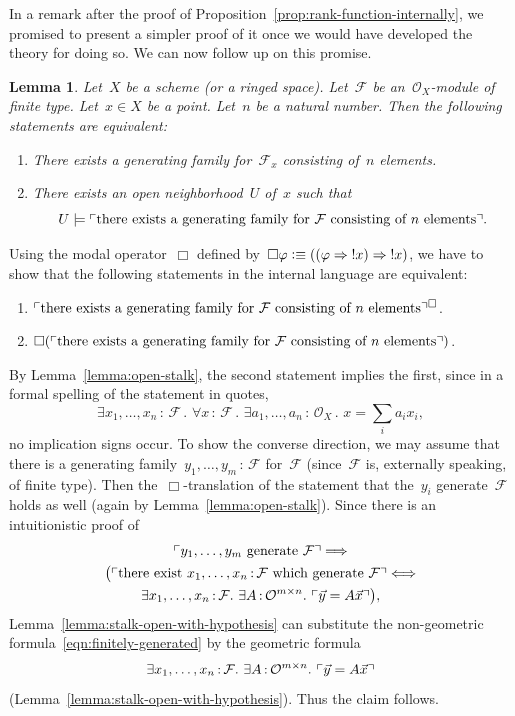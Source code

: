 \documentclass[10pt,reqno,a4paper]{amsbook}
\makeatletter
\theoremstyle{definition}
\theoremstyle{plain}
\newtheorem{lemma}[defn]{Lemma}
\theoremstyle{remark}
\newcommand{\F}{\mathcal{F}}
\renewcommand{\O}{\mathcal{O}}
\newcommand{\?}{\,{:}\,}
\renewcommand{\_}{\mathpunct{.}\,}
\newcommand{\speak}[1]{\ulcorner\text{\textnormal{#1}}\urcorner}
\newcommand{\notat}[1]{{!#1}}
\newcommand{\defequiv}{\vcentcolon\equiv}
\renewenvironment{proof}[1][\proofname]{\par
  \pushQED{\qed}%
  \normalfont \topsep6\p@\@plus6\p@\relax
  \trivlist
  \item[\hskip\labelsep
        \itshape
    #1\@addpunct{.}]\ignorespaces
}{%
  \popQED\endtrivlist\@endpefalse
}
\makeatother
\begin{document}
In a remark after the proof of Proposition~\ref{prop:rank-function-internally},
we promised to present a simpler proof of it once we would have developed the theory for
doing so. We can now follow up on this promise.
\begin{lemma}\label{lemma:gen-family-n}
Let~$X$ be a scheme (or a ringed space). Let~$\F$ be an~$\O_X$-module
of finite type. Let~$x \in X$ be a point. Let~$n$ be a natural number. Then the
following statements are equivalent:
\begin{enumerate}
\item There exists a generating family for~$\F_x$ consisting of~$n$ elements.
\item There exists an open neighborhood~$U$ of~$x$ such that
\[ U \models \speak{there exists a generating family for~$\F$ consisting of~$n$
elements}. \]
\end{enumerate}
\end{lemma}
\begin{proof}Using the modal operator~$\Box$ defined by~$\Box\varphi \defequiv
((\varphi \Rightarrow \notat{x}) \Rightarrow \notat{x})$, we have to show that
the following statements in the internal language are equivalent:
\begin{enumerate}
\item $\speak{there exists a generating family
for~$\F$ consisting of~$n$ elements}^\Box$.
\item $\Box(\speak{there exists a generating family
for~$\F$ consisting of~$n$ elements})$.
\end{enumerate}
By Lemma~\ref{lemma:open-stalk}, the second statement implies the first, since
in a formal spelling of the statement in quotes,
\begin{equation}\label{eqn:finitely-generated}\tag{$\star$}
  \exists x_1,\ldots,x_n\?\F\_
  \forall x\?\F\_
  \exists a_1,\ldots,a_n\?\O_X\_
  x = \textstyle\sum_i a_i x_i,
\end{equation}
no implication signs occur. To show the converse direction,
we may assume that there is a generating family~$y_1,\ldots,y_m\?\F$ for~$\F$
(since~$\F$ is, externally speaking, of finite type). Then
the~$\Box$-translation of the statement that the~$y_i$ generate~$\F$ holds as
well (again by Lemma~\ref{lemma:open-stalk}). Since there is an intuitionistic
proof of
\begin{multline*}
  \speak{$y_1,\ldots,y_m$ generate~$\F$} \Longrightarrow \\
  \bigl(\speak{there exist $x_1,\ldots,x_n\?\F$ which generate~$\F$}
    \Longleftrightarrow \\
    \exists x_1,\ldots,x_n\?\F\_
    \exists A\?\O^{m \times n}\_ \speak{$\vec y = A \vec x$}\bigr),
\end{multline*}
Lemma~\ref{lemma:stalk-open-with-hypothesis} can substitute the non-geometric formula~\eqref{eqn:finitely-generated} by the geometric
formula
\[ \exists x_1,\ldots,x_n\?\F\_ \exists A\?\O^{m \times n}\_ \speak{$\vec
y = A \vec x$} \]
(Lemma~\ref{lemma:stalk-open-with-hypothesis}). Thus the claim follows.
\end{proof}
\end{document}
